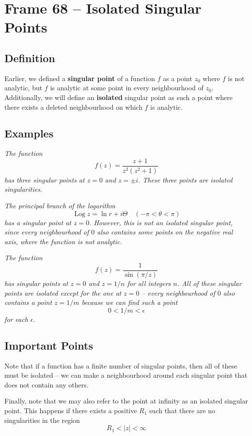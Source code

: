 \documentclass{article}
\renewcommand{\emph}{\textbf}
\DeclareMathOperator{\Log}{Log}
\begin{document}
\tableofcontents 

\clearpage
\section{Frame 68 -- Isolated Singular Points}
\subsection{Definition}
Earlier, we defined a \emph{singular point} of a function $f$ as a point $z_0$ where $f$ is not analytic, but $f$ is analytic at some point in every neighbourhood of $z_0$. Additionally, we will define an \emph{isolated} singular point as such a point where there exists a deleted neighbourhood on which $f$ is analytic.

\subsection{Examples}
\textit{The function
\[
	f(z) = \frac{z+1}{z^3 (z^2 + 1)}
\]
has three singular points at $z = 0$ and $z = \pm i$. These three points are isolated singularities.}

\textit{The principal branch of the logarithm
\[
	\Log z = \ln r + i\Theta 	\quad (-\pi < \theta < \pi)
\]
has a singular point at $z = 0$. However, this is not an isolated singular point, since every neighbourhood of $0$ also contains some points on the negative real axis, where the function is not analytic.}

\textit{The function
\[
	f(z) = \frac{1}{\sin(\pi / z)}
\]
has singular points at $z = 0$ and $z = 1/n$ for all integers $n$. All of these singular points are isolated except for the one at $z = 0$ -- every neighbourhood of $0$ also contains a point $z = 1/m$ because we can find such a point
\[
	0 < 1/m < \epsilon
\]
for each $\epsilon$.}

\subsection{Important Points}
Note that if a function has a finite number of singular points, then all of these must be isolated -- we can make a neighbourhood around each singular point that does not contain any others.

Finally, note that we may also refer to the point at infinity as an isolated singular point. This happens if there exists a positive $R_1$ such that there are no singularities in the region
\[
	R_1 < |z| < \infty
\]
\end{document}
